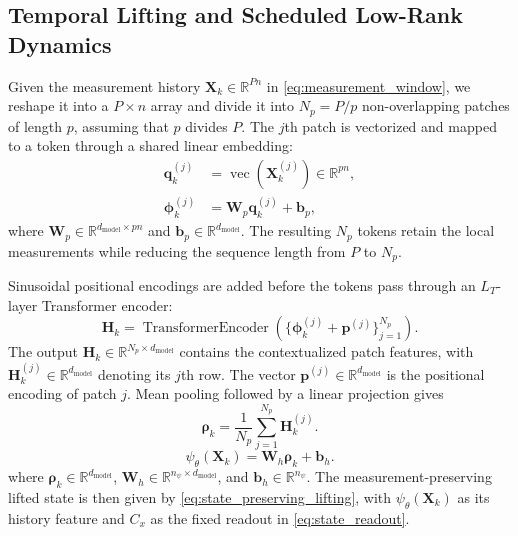 \documentclass[journal]{IEEEtran}
\newcommand{\vq}{\mathbf{q}}
\newcommand{\vphi}{\boldsymbol{\phi}}
\newcommand{\vp}{\mathbf{p}}
\newcommand{\vb}{\mathbf{b}}
\newcommand{\mH}{\mathbf{H}}
\newcommand{\mW}{\mathbf{W}}
\newcommand{\mX}{\mathbf{X}}
\newcommand{\R}{\mathbb{R}}
\begin{document}
\subsection{Temporal Lifting and Scheduled Low-Rank Dynamics}
\label{sec:temporal_lifting}

Given the measurement history $\mX_k\in\R^{Pn}$ in \eqref{eq:measurement_window}, we reshape it into a $P\times n$ array and divide it into $N_p=P/p$ non-overlapping patches of length $p$, assuming that $p$ divides $P$. The $j$th patch is vectorized and mapped to a token through a shared linear embedding:
\begin{align}
    \vq_k^{(j)}&=\operatorname{vec}(\mX_k^{(j)})\in\R^{pn},
    \label{eq:patch_vec}\\
    \vphi_k^{(j)}&=\mW_p\vq_k^{(j)}+\vb_p,
    \label{eq:patch_embedding}
\end{align}
where $\mW_p\in\R^{d_{\mathrm{model}}\times pn}$ and $\vb_p\in\R^{d_{\mathrm{model}}}$. The resulting $N_p$ tokens retain the local measurements while reducing the sequence length from $P$ to $N_p$.

Sinusoidal positional encodings \cite{vaswani2017attention} are added before the tokens pass through an $L_T$-layer Transformer encoder:
\begin{equation}
    \mH_k=\operatorname{TransformerEncoder}\!\left(
        \{\vphi_k^{(j)}+\vp^{(j)}\}_{j=1}^{N_p}\right).
    \label{eq:transformer_enc}
\end{equation}
The output $\mH_k\in\R^{N_p\times d_{\mathrm{model}}}$ contains the contextualized patch features, with $\mH_k^{(j)}\in\R^{d_{\mathrm{model}}}$ denoting its $j$th row. The vector $\vp^{(j)}\in\R^{d_{\mathrm{model}}}$ is the positional encoding of patch $j$. Mean pooling followed by a linear projection gives
\begin{equation}
    \boldsymbol{\rho}_k=\frac{1}{N_p}\sum_{j=1}^{N_p}\mH_k^{(j)}.
    \label{eq:history_pooling}
\end{equation}
\begin{equation}
    \psi_\theta(\mX_k)=\mW_h\boldsymbol{\rho}_k+\vb_h.
    \label{eq:history_feature}
\end{equation}
where $\boldsymbol{\rho}_k\in\R^{d_{\mathrm{model}}}$, $\mW_h\in\R^{n_\psi\times d_{\mathrm{model}}}$, and $\vb_h\in\R^{n_\psi}$. The measurement-preserving lifted state is then given by \eqref{eq:state_preserving_lifting}, with $\psi_\theta(\mX_k)$ as its history feature and $C_x$ as the fixed readout in \eqref{eq:state_readout}.
\end{document}
